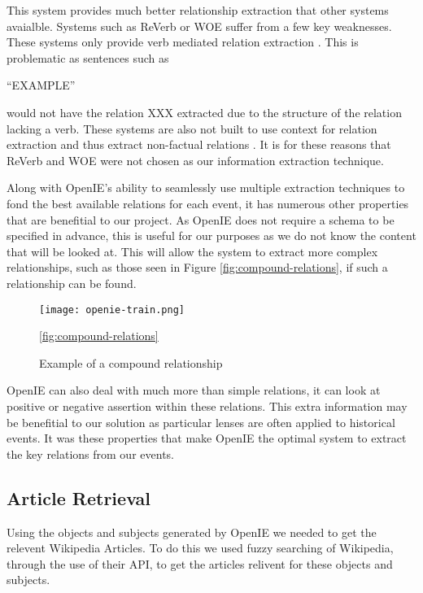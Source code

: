\documentclass[bsc,frontabs,twoside,singlespacing,parskip,deptreport]{infthesis}     %
\begin{document}
This system provides much better relationship extraction that other systems avaialble. Systems such as
ReVerb or WOE suffer from a few key weaknesses. These systems only provide verb mediated relation extraction \cite{schmitz2012open}. This is problematic as sentences such as

``EXAMPLE''

would not have the relation XXX extracted due to the structure of the relation lacking a verb.
These systems are also not built to use context for relation extraction and thus extract non-factual relations \cite{schmitz2012open}.
It is for these reasons that ReVerb and WOE were not chosen as our information extraction technique.


Along with OpenIE's ability to seamlessly use multiple extraction techniques to fond the best available
relations for each event, it has numerous other properties that are benefitial to our project.
As OpenIE does not require a schema to be specified in advance, this is useful for our purposes
as we do not know the content that will be looked at. This will allow the system to extract
more complex relationships, such as those seen in Figure \ref{fig:compound-relations}, if such
a relationship can be found.


\begin{figure}[h]
  \centering
  \texttt{[image: openie-train.png]}
  \caption{Example of a compound relationship \cite{OpenIE}}
  \ref{fig:compound-relations}
  \end{figure}

OpenIE can also deal with much more than simple relations,
it can look at positive or negative assertion within these relations.
This extra information may be benefitial to our solution as particular lenses are often applied to historical events.
It was these properties that make OpenIE the optimal system to extract the key relations from our events.


\subsection{Article Retrieval}
Using the objects and subjects generated by OpenIE we needed to get the relevent Wikipedia Articles.
To do this we used fuzzy searching of Wikipedia, through the use of their API, to get the articles relivent
for these objects and subjects.
\end{document}
